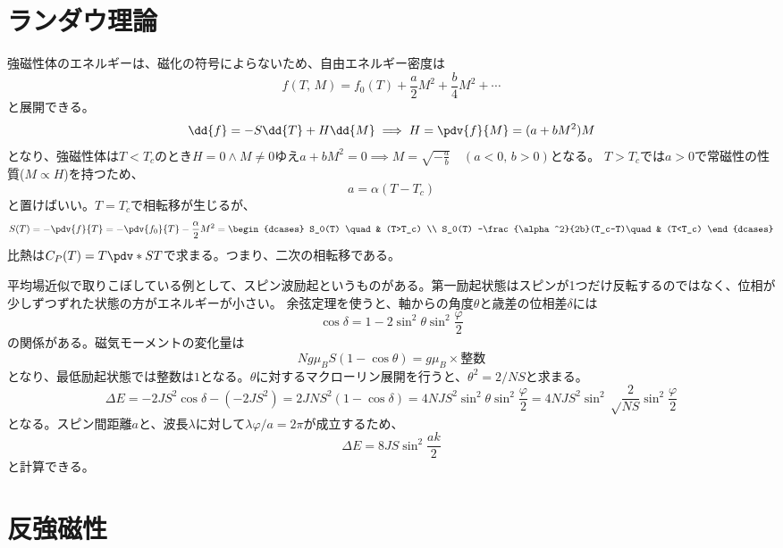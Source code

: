 \section{ランダウ理論}
強磁性体のエネルギーは、磁化の符号によらないため、自由エネルギー密度は
\begin{equation}
	f(T,\,M) = f_0(T) + \frac{a}{2}M^2 + \frac{b}{4}M^2+\cdots
\end{equation}
と展開できる。
\begin{equation}
	\dd{f} = -S\dd{T} + H\dd{M}\implies H = \pdv{f}{M} = (a+bM^2)M
\end{equation}
となり、強磁性体は$T<T_c$のとき$H=0\wedge{}M\neq 0$ゆえ$a+bM^2=0\implies M = \sqrt{-\frac{a}{b}}\quad(a<0,\,b>0)$となる。
$T>T_c$では$a>0$で常磁性の性質($M\propto{}H$)を持つため、
\begin{equation}
	a = \alpha(T-T_c)
\end{equation}
と置けばいい。$T=T_c$で相転移が生じるが、
\begin{equation}
	S(T) = -\pdv{f}{T} = -\pdv{f_0}{T} - \frac{\alpha}{2}M^2 =
	\begin{dcases}
		S_0(T) \quad                            & (T>T_c) \\
		S_0(T) -\frac{\alpha^2}{2b}(T_c-T)\quad & (T<T_c)
	\end{dcases}
\end{equation}
比熱は$C_P(T) = T\pdv*{S}{T}$で求まる。つまり、二次の相転移である。

平均場近似で取りこぼしている例として、スピン波励起というものがある。第一励起状態はスピンが1つだけ反転するのではなく、位相が少しずつずれた状態の方がエネルギーが小さい。
余弦定理を使うと、軸からの角度$\theta$と歳差の位相差$\delta$には
\begin{equation}
	\cos\delta = 1-2\sin^2\theta\sin^2\frac{\varphi}{2}
\end{equation}
の関係がある。磁気モーメントの変化量は
\begin{equation}
	Ng\mu_BS(1-\cos\theta) = g\mu_B\times{\text{整数}}
\end{equation}
となり、最低励起状態では整数は$1$となる。$\theta$に対するマクローリン展開を行うと、$\theta^2 = 2/NS$と求まる。
\begin{equation}
	\varDelta E = -2JS^2\cos\delta - (-2JS^2) = 2JNS^2(1-\cos\delta) = 4NJS^2\sin^2\theta\sin^2\frac{\varphi}{2} = 4NJS^2\sin^2\sqrt\frac{2}{NS}\sin^2\frac{\varphi}{2}
\end{equation}
となる。スピン間距離$a$と、波長$\lambda$に対して$\lambda\varphi/a = 2\pi$が成立するため、
\begin{equation}
	\varDelta E = 8JS\sin^2\frac{ak}{2}
\end{equation}
と計算できる。
\section{反強磁性}

